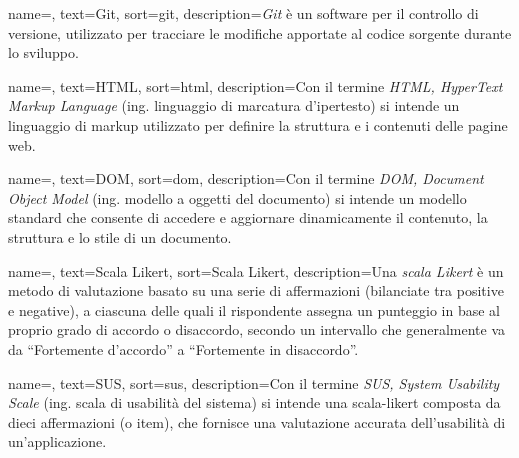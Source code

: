  {
    name=,
    text=Git,
    sort=git,
    description={\emph{Git} è un software per il controllo di versione, utilizzato per tracciare le modifiche apportate al codice sorgente durante lo sviluppo.}
}

 {
    name=,
    text=HTML,
    sort=html,
    description={Con il termine \emph{HTML, HyperText Markup Language} (ing. linguaggio di marcatura d'ipertesto) si intende un linguaggio di markup utilizzato per definire la struttura e i contenuti delle pagine web.}
}

 {
    name=,
    text=DOM,
    sort=dom,
    description={Con il termine \emph{DOM, Document Object Model} (ing. modello a oggetti del documento) si intende un modello standard che consente di accedere e aggiornare dinamicamente il contenuto, la struttura e lo stile di un documento.}
}

 {
    name=,
    text=Scala Likert,
    sort=Scala Likert,
    description={Una \emph{scala Likert} è un metodo di valutazione basato su una serie di affermazioni (bilanciate tra positive e negative), a ciascuna delle quali il rispondente assegna un punteggio in base al proprio grado di accordo o disaccordo, secondo un intervallo che generalmente va da “Fortemente d'accordo” a “Fortemente in disaccordo”.}
}

 {
    name=,
    text=SUS,
    sort=sus,
    description={Con il termine \emph{SUS, System Usability Scale} (ing. scala di usabilità del sistema) si intende una \gls{scala-likert} composta da dieci affermazioni (o item), che fornisce una valutazione accurata dell'usabilità di un'applicazione.}
}
